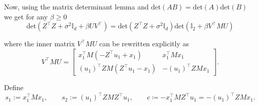 \documentclass[11pt]{article}
\theoremstyle{definition}
\theoremstyle{plain}
\providecommand{\brI}{\mathbb{I}}
\newcommand{\deter}[1]{\mathrm{det}\left(#1 \right)}
\begin{document}
Now, using the matrix determinant lemma and $\mathrm{det}(AB) = \mathrm{det}(A)\mathrm{det}(B)$ we get for any \(\beta \geq 0\)
\begin{equation}
    \label{eq:determinant_lemma_2}
    \deter{Z^{\top}Z + \sigma^2\brI_d + \beta UV^{\top}} = \deter{Z^{\top}Z + \sigma^2\brI_d}\deter{\brI_2 + \beta V^{\top}MU}
\end{equation}

where the inner matrix $V^{\top}MU$ can be rewritten explicitly as
\begin{equation}
    V^{\top}MU = 
        \begin{bmatrix}
                            x^{\top}_1M(-Z^{\top}u_1+x_1) & x^{\top}_1Mx_1 \\
                            (u_1)^{\top}ZM(Z^{\top}u_1-x_1) & -(u_1)^{\top}ZMx_1
        \end{bmatrix}.
\end{equation}

Define
\begin{equation}
    s_1:=x^{\top}_1Mx_1,\qquad s_2:=(u_1)^{\top}ZMZ^{\top}u_1, \qquad c\coloneq -x^{\top}_1MZ^{\top}u_1 = -(u_1)^{\top}ZMx_1.
\end{equation}
\end{document}
